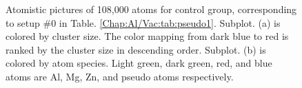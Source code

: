 \newpage
\begingroup
\begin{figure}[!ht]
  \centering
\caption[Atomistic pictures of 108,000 atoms for $\varepsilon_{Al-X}$ sensitivity test.]{Atomistic pictures of 108,000 atoms for control group, corresponding to setup \#0 in Table. \ref{Chap:Al/Vac:tab:pseudo1}. Subplot. (a) is colored by cluster size. The color mapping from dark blue to red is ranked by the cluster size in descending order. Subplot. (b) is colored by atom species. Light green, dark green, red, and blue atoms are Al, Mg, Zn, and pseudo atoms respectively.}
\label{Chap:Al/Vac:fig:sens_control}
\end{figure}
\endgroup



